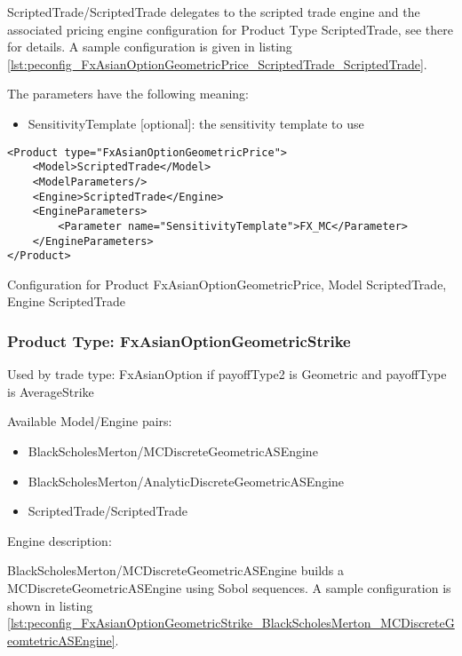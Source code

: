 ScriptedTrade/ScriptedTrade delegates to the scripted trade engine and the associated pricing engine configuration for
Product Type ScriptedTrade, see there for details. A sample configuration is given in listing
\ref{lst:peconfig_FxAsianOptionGeometricPrice_ScriptedTrade_ScriptedTrade}.

The parameters have the following meaning:

\begin{itemize}
\item SensitivityTemplate [optional]: the sensitivity template to use 
\end{itemize}

\begin{longlisting}
\begin{verbatim}
<Product type="FxAsianOptionGeometricPrice">
    <Model>ScriptedTrade</Model>
    <ModelParameters/>
    <Engine>ScriptedTrade</Engine>
    <EngineParameters>
        <Parameter name="SensitivityTemplate">FX_MC</Parameter>
    </EngineParameters>
</Product>
\end{verbatim}
\caption{Configuration for Product FxAsianOptionGeometricPrice, Model ScriptedTrade, Engine ScriptedTrade}
\label{lst:peconfig_FxAsianOptionGeometricPrice_ScriptedTrade_ScriptedTrade}
\end{longlisting}

\subsubsection{Product Type: FxAsianOptionGeometricStrike}

Used by trade type: FxAsianOption if payoffType2 is Geometric and payoffType is AverageStrike

Available Model/Engine pairs:

\begin{itemize}
  \item BlackScholesMerton/MCDiscreteGeometricASEngine
  \item BlackScholesMerton/AnalyticDiscreteGeometricASEngine
  \item ScriptedTrade/ScriptedTrade
\end{itemize}

Engine description:

BlackScholesMerton/MCDiscreteGeometricASEngine builds a MCDiscreteGeometricASEngine using Sobol sequences. A sample
configuration is shown in listing
\ref{lst:peconfig_FxAsianOptionGeometricStrike_BlackScholesMerton_MCDiscreteGeomtetricASEngine}.

